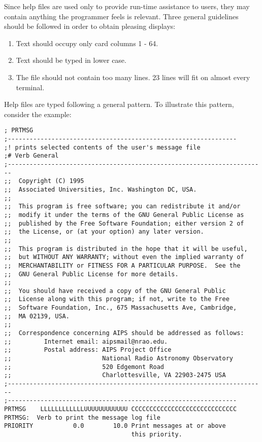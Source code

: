      Since help files are used only to provide run-time assistance to
users, they may contain anything the programmer feels is relevant.
Three general guidelines should be followed in order to obtain pleasing
displays:

\begin{enumerate}
\item Text should occupy only card columns 1 - 64.
\item Text should be typed in lower case.
\item The file should not contain too many lines.  23 lines will fit
on almost every terminal.
\end{enumerate}

Help files are typed following a general pattern.  To illustrate this
pattern, consider the example:

\begin{verbatim}
; PRTMSG
;---------------------------------------------------------------
;! prints selected contents of the user's message file
;# Verb General
;-----------------------------------------------------------------------
;;  Copyright (C) 1995
;;  Associated Universities, Inc. Washington DC, USA.
;;
;;  This program is free software; you can redistribute it and/or
;;  modify it under the terms of the GNU General Public License as
;;  published by the Free Software Foundation; either version 2 of
;;  the License, or (at your option) any later version.
;;
;;  This program is distributed in the hope that it will be useful,
;;  but WITHOUT ANY WARRANTY; without even the implied warranty of
;;  MERCHANTABILITY or FITNESS FOR A PARTICULAR PURPOSE.  See the
;;  GNU General Public License for more details.
;;
;;  You should have received a copy of the GNU General Public
;;  License along with this program; if not, write to the Free
;;  Software Foundation, Inc., 675 Massachusetts Ave, Cambridge,
;;  MA 02139, USA.
;;
;;  Correspondence concerning AIPS should be addressed as follows:
;;         Internet email: aipsmail@nrao.edu.
;;         Postal address: AIPS Project Office
;;                         National Radio Astronomy Observatory
;;                         520 Edgemont Road
;;                         Charlottesville, VA 22903-2475 USA
;-----------------------------------------------------------------------
;---------------------------------------------------------------
PRTMSG    LLLLLLLLLLLLUUUUUUUUUUUU CCCCCCCCCCCCCCCCCCCCCCCCCCCCC
PRTMSG:  Verb to print the message log file
PRIORITY           0.0        10.0 Print messages at or above
                                   this priority.

\end{verbatim}
